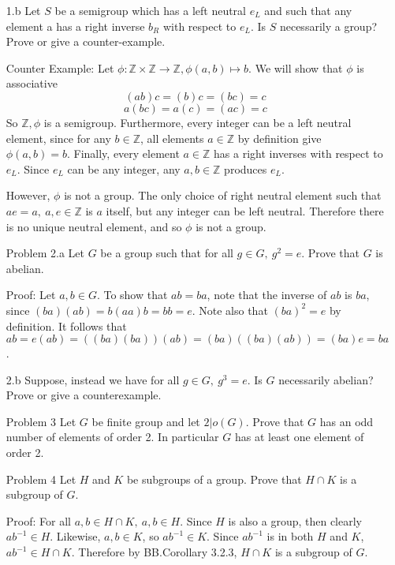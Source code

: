 \documentclass[letterpaper]{article}
\newcommand{\Integers}{\mathbb{Z}}
\begin{document}
\begin{itemize}
      \item[1.b] Let \(S\) be a semigroup which has a left neutral \(e_L\) and such that any element a has a right inverse \(b_R\) with respect to \(e_L\). Is \(S\) necessarily a group? Prove or give a counter-example.

            Counter Example: Let \(\phi: \Integers \times \Integers \rightarrow \Integers, \phi(a, b) \mapsto b\). We will show that  \(\phi\) is associative \[(ab)c = (b)c = (bc) = c\] \[a(bc) = a(c) = (ac) = c\]
            So \(\Integers, \phi\) is a semigroup. Furthermore, every integer can be a left neutral element, since for any \(b \in \Integers\), all elements \(a \in \Integers\) by definition give \(\phi(a, b) = b\).
            Finally, every element \(a \in \Integers\) has a right inverses with respect to \(e_L\). Since \(e_L\) can be any integer, any \(a, b \in \Integers\) produces \(e_L\).

            However, \(\phi\) is not a group. The only choice of right neutral element such that \(ae = a,\ a, e \in \Integers\) is \(a\) itself, but any integer can be left neutral. Therefore there is no unique neutral element, and so \(\phi\) is not a group.

      \item[Problem 2.a] Let \(G\) be a group such that for all \(g \in G,\ g^2 = e\). Prove that \(G\) is abelian.

            Proof: Let \(a, b \in G\). To show that \(ab = ba\), note that the inverse of \(ab\) is \(ba\), since \((ba)(ab) = b(aa)b = bb = e\). Note also that \({(ba)}^2 = e\) by definition. It follows that \(ab = e(ab) = ((ba)(ba))(ab) = (ba)((ba)(ab)) = (ba)e = ba\).

      \item[2.b] Suppose, instead we have for all  \(g \in G,\ g^3 = e\). Is \(G\) necessarily abelian? Prove or give a counterexample.

      \item[Problem 3] Let \(G\) be finite group and let \(2| o(G)\). Prove that \(G\) has an odd number of elements of order 2. In particular \(G\) has at least one element of order 2.

      \item[Problem 4]  Let \(H\) and \(K\) be subgroups of a group. Prove that \(H \cap K\) is a subgroup of \(G\).

            Proof: For all \(a, b \in H \cap K,\ a, b \in H\). Since \(H\) is also a group, then clearly \(ab^{-1} \in H\). Likewise, \(a, b \in K\), so \(ab^{-1} \in K\). Since \(ab^{-1}\) is in both \(H\) and \(K\), \(ab^{-1}\in H \cap K\). Therefore by BB.Corollary 3.2.3, \(H \cap K\) is a subgroup of \(G\).


\end{itemize}
\end{document}
